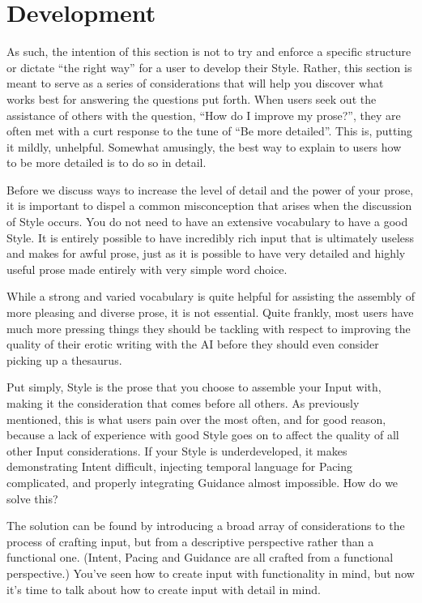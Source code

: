 \documentclass[Coomer-main.tex]{subfiles}
\begin{document}
\section{Development}
\label{sec:stdevelop}

As such, the intention of this section is not to try and enforce a specific structure or dictate “the right way” for a user to develop their Style.
Rather, this section is meant to serve as a series of considerations that will help you discover what works best for answering the questions put forth.
When users seek out the assistance of others with the question, “How do I improve my prose?”, they are often met with a curt response to the tune of “Be more detailed”.
This is, putting it mildly, unhelpful.
Somewhat amusingly, the best way to explain to users how to be more detailed is to do so in detail.

Before we discuss ways to increase the level of detail and the power of your prose, it is important to dispel a common misconception that arises when the discussion of Style occurs.
You do not need to have an extensive vocabulary to have a good Style.
It is entirely possible to have incredibly rich input that is ultimately useless and makes for awful prose, just as it is possible to have very detailed and highly useful prose made entirely with very simple word choice.

While a strong and varied vocabulary is quite helpful for assisting the assembly of more pleasing and diverse prose, it is not essential.
Quite frankly, most users have much more pressing things they should be tackling with respect to improving the quality of their erotic writing with the AI before they should even consider picking up a thesaurus.

Put simply, Style is the prose that you choose to assemble your Input with, making it the consideration that comes before all others.
As previously mentioned, this is what users pain over the most often, and for good reason, because a lack of experience with good Style goes on to affect the quality of all other Input considerations.
If your Style is underdeveloped, it makes demonstrating Intent difficult, injecting temporal language for Pacing complicated, and properly integrating Guidance almost impossible.
How do we solve this?

The solution can be found by introducing a broad array of considerations to the process of crafting input, but from a descriptive perspective rather than a functional one.
(Intent, Pacing and Guidance are all crafted from a functional perspective.)
You’ve seen how to create input with functionality in mind, but now it’s time to talk about how to create input with detail in mind.
\end{document}

